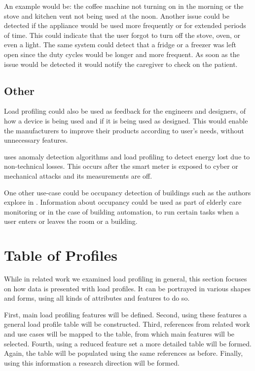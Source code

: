 An example would be: the coffee machine not turning on in the morning or the stove and kitchen vent not being used at the noon.
Another issue could be detected if the appliance would be used more frequently or for extended periods of time. 
This could indicate that the user forgot to turn off the stove, oven, or even a light. The same system could detect 
that a fridge or a freezer was left open since the duty cycles would be longer and more frequent. 
As soon as the issue would be detected it would notify the caregiver to check on the patient.

\subsection{Other}

Load profiling could also be used as feedback for the engineers and designers,
of how a device is being used and if it is being used as designed. 
This would enable the manufacturers to improve their products according to 
user's needs, without unnecessary features.

\cite{energyStealing2018} uses anomaly detection algorithms and load profiling to detect energy lost due to non-technical losses.
This occurs after the smart meter is exposed to cyber or mechanical attacks and its measurements are off. 

One other use-case could be occupancy detection of buildings such as the authors explore in \cite{occupancy2013}. Information about 
occupancy could be used as part of elderly care monitoring or in the case of building
automation, to run certain tasks when a user enters or leaves the room or a building.

\section{Table of Profiles}

While in related work we examined load profiling in general,
this section focuses on how data is presented with load profiles.  
It can be portrayed in various shapes and forms,
using all kinds of attributes and features to do so. 

First, main load profiling features will be defined.
Second, using these features a general load profile table will be constructed.
Third, references from related work and use cases will be mapped to the table, from which main features will be selected.
Fourth, using a reduced feature set a more detailed table will be formed.
Again, the table will be populated using the same references as before.
Finally, using this information a research direction will be formed.

